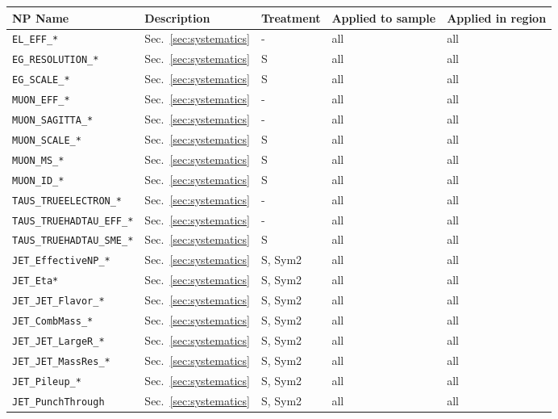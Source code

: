 \begin{table}[ht]
    \centering
    \scriptsize
    \begin{tabular}{|p{3.5cm}|p{2.0cm}|p{1.5cm}|p{2cm}|p{1.5cm}|}
        \hline
        NP Name & Description & Treatment & Applied to sample & Applied in region \\
        \hline
        \texttt{EL\_EFF\_*} & Sec.~\ref{sec:systematics} & - & all & all \\
        \texttt{EG\_RESOLUTION\_*} & Sec.~\ref{sec:systematics} & S & all & all \\
        \texttt{EG\_SCALE\_*} & Sec.~\ref{sec:systematics} & S & all & all \\
        \texttt{MUON\_EFF\_*} & Sec.~\ref{sec:systematics} & - & all & all \\
        \texttt{MUON\_SAGITTA\_*} & Sec.~\ref{sec:systematics} & - & all & all \\
        \texttt{MUON\_SCALE\_*} & Sec.~\ref{sec:systematics} & S & all & all \\
        \texttt{MUON\_MS\_*} & Sec.~\ref{sec:systematics} & S & all & all \\
        \texttt{MUON\_ID\_*} & Sec.~\ref{sec:systematics} & S & all & all \\
        \texttt{TAUS\_TRUEELECTRON\_*} & Sec.~\ref{sec:systematics} & - & all & all \\
        \texttt{TAUS\_TRUEHADTAU\_EFF\_*} & Sec.~\ref{sec:systematics} & - & all & all \\
        \texttt{TAUS\_TRUEHADTAU\_SME\_*} & Sec.~\ref{sec:systematics} & S & all & all \\
        \texttt{JET\_EffectiveNP\_*} & Sec.~\ref{sec:systematics} & S, Sym2 & all & all \\
        \texttt{JET\_Eta*} & Sec.~\ref{sec:systematics} & S, Sym2 & all & all \\
        \texttt{JET\_JET\_Flavor\_*} & Sec.~\ref{sec:systematics} & S, Sym2 & all & all \\
        \texttt{JET\_CombMass\_*} & Sec.~\ref{sec:systematics} & S, Sym2 & all & all \\
        \texttt{JET\_JET\_LargeR\_*} & Sec.~\ref{sec:systematics} & S, Sym2 & all & all \\
        \texttt{JET\_JET\_MassRes\_*} & Sec.~\ref{sec:systematics} & S, Sym2 & all & all \\
        \texttt{JET\_Pileup\_*} & Sec.~\ref{sec:systematics} & S, Sym2 & all & all \\
        \texttt{JET\_PunchThrough} & Sec.~\ref{sec:systematics} & S, Sym2 & all & all \\

\end{tabular}
\end{table}
